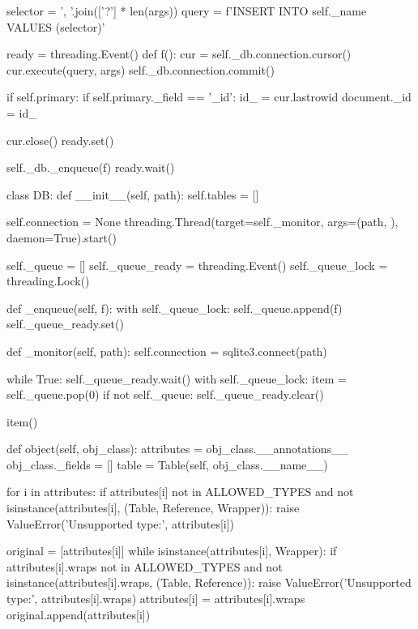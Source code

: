 \begin{pythoncode}
        selector = ', '.join(['?'] * len(args))
        query = f'INSERT INTO {self._name} VALUES ({selector})'

        ready = threading.Event()
        def f():
            cur = self._db.connection.cursor()
            cur.execute(query, args)
            self._db.connection.commit()

            if self.primary:
                if self.primary._field == '_id':
                    id_ = cur.lastrowid
                    document._id = id_

            cur.close()
            ready.set()

        self._db._enqueue(f)
        ready.wait()


class DB:
    def __init__(self, path):
        self.tables = []

        self.connection = None
        threading.Thread(target=self._monitor, args=(path, ), daemon=True).start()

        self._queue = []
        self._queue_ready = threading.Event()
        self._queue_lock = threading.Lock()
    
    def _enqueue(self, f):
        with self._queue_lock:
            self._queue.append(f)
            self._queue_ready.set()

    def _monitor(self, path):
        self.connection = sqlite3.connect(path)

        while True:
            self._queue_ready.wait()
            with self._queue_lock:
                item = self._queue.pop(0)
                if not self._queue:
                    self._queue_ready.clear()

            item()

    def object(self, obj_class):
        attributes = obj_class.__annotations__
        obj_class._fields = []
        table = Table(self, obj_class.__name__)

        for i in attributes:
            if attributes[i] not in ALLOWED_TYPES and not isinstance(attributes[i], (Table, Reference, Wrapper)):
                raise ValueError('Unsupported type:', attributes[i])

            original = [attributes[i]]
            while isinstance(attributes[i], Wrapper):
                if attributes[i].wraps not in ALLOWED_TYPES and not isinstance(attributes[i].wraps, (Table, Reference)):
                    raise ValueError('Unsupported type:', attributes[i].wraps)
                attributes[i] = attributes[i].wraps
                original.append(attributes[i])


\end{pythoncode}
